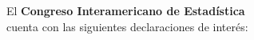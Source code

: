 \documentclass[12pt,a4paper]{article}
\renewcommand{\headrulewidth}{0.4pt}
\renewcommand{\footrulewidth}{0.4pt}
\newcommand{\Footer}{17 al 20 de octubre 2017. Rosario, Argentina}
\newcommand{\SetHeader}[2]{
	\fancyhead{}
	\fancyhead[LE,RO]{\textit{#1}}
	\fancyhead[RE,LO]{ #2}
	\fancyfoot{}
	\fancyfoot[LE,RO]{\thepage}
	\fancyfoot[RE,LO]{\small{\Footer}}
	\renewcommand{\headrulewidth}{0.4pt}
	\renewcommand{\footrulewidth}{0.4pt}
}
\begin{document}
%
%
%
%
%
%



\newpage
\noindent
\thispagestyle{empty}

\vspace*{3cm}

\begin{center}
El {\bfseries Congreso Interamericano de Estadística}\\cuenta con las siguientes declaraciones de interés:\\ 
\end{center}

\end{document}
